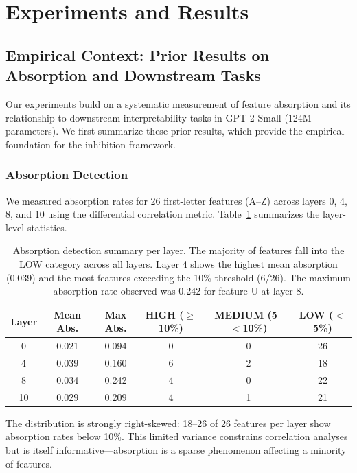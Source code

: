 \documentclass{article}
\begin{document}
\section{Experiments and Results}
\label{sec:results}

\subsection{Empirical Context: Prior Results on Absorption and Downstream Tasks}
\label{sec:prior-results}

Our experiments build on a systematic measurement of feature absorption and its relationship to downstream interpretability tasks in GPT-2 Small (124M parameters). We first summarize these prior results, which provide the empirical foundation for the inhibition framework.

\subsubsection{Absorption Detection}

We measured absorption rates for 26 first-letter features (A--Z) across layers 0, 4, 8, and 10 using the \citet{chanin2024quantifying} differential correlation metric. Table~\ref{tab:absorption-summary} summarizes the layer-level statistics.

\begin{table}[t]
\caption{Absorption detection summary per layer. The majority of features fall into the LOW category across all layers. Layer 4 shows the highest mean absorption (0.039) and the most features exceeding the 10\% threshold (6/26). The maximum absorption rate observed was 0.242 for feature U at layer 8.}
\label{tab:absorption-summary}
\centering
\small
\begin{tabular}{@{}cccccc@{}}
\toprule
Layer & Mean Abs. & Max Abs. & HIGH ($\geq$10\%) & MEDIUM (5--$<$10\%) & LOW ($<$5\%) \\
\midrule
0  & 0.021 & 0.094 & 0 & 0 & 26 \\
4  & 0.039 & 0.160 & 6 & 2 & 18 \\
8  & 0.034 & 0.242 & 4 & 0 & 22 \\
10 & 0.029 & 0.209 & 4 & 1 & 21 \\
\bottomrule
\end{tabular}
\end{table}

The distribution is strongly right-skewed: 18--26 of 26 features per layer show absorption rates below 10\%. This limited variance constrains correlation analyses but is itself informative---absorption is a sparse phenomenon affecting a minority of features.
\end{document}
